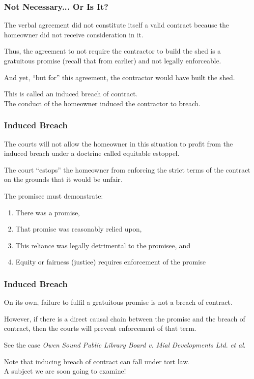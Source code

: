 \begin{frame}
\frametitle{Not Necessary... Or Is It?}

The verbal agreement did not constitute itself a valid contract because the homeowner did not receive consideration in it.

Thus, the agreement to not require the contractor to build the shed is a gratuitous promise (recall that from earlier) and not legally enforceable.

And yet, ``but for'' this agreement, the contractor would have built the shed.

This is called an \alert{induced breach} of contract.\\
\quad The conduct of the homeowner induced the contractor to breach.

\end{frame}



\begin{frame}
\frametitle{Induced Breach}

The courts will not allow the homeowner in this situation to profit from the induced breach under a doctrine called \alert{equitable estoppel}.

The court ``estops'' the homeowner from enforcing the strict terms of the contract on the grounds that it would be unfair.

The promisee must demonstrate:

\begin{enumerate}
\item There was a promise,
\item That promise was reasonably relied upon,
\item This reliance was legally detrimental to the promisee, and
\item Equity or fairness (justice) requires enforcement of the promise
\end{enumerate}

\end{frame}



\begin{frame}
\frametitle{Induced Breach}

On its own, failure to fulfil a gratuitous promise is not a breach of contract.

However, if there is a direct causal chain between the promise and the breach of contract, then the courts will prevent enforcement of that term.

See the case \textit{Owen Sound Public Library Board v. Mial Developments Ltd. et al}.

Note that inducing breach of contract can fall under tort law.\\
\quad A subject we are soon going to examine!

\end{frame}




